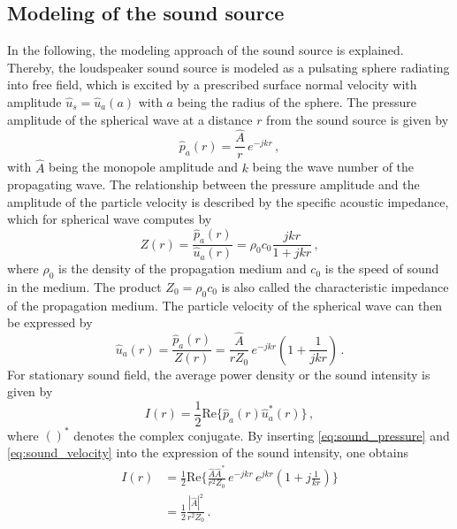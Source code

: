 \subsection*{Modeling of the sound source}

In the following, the modeling approach of the sound source is explained. Thereby, the loudspeaker sound source is modeled as a pulsating sphere radiating into free field, which is excited by a prescribed surface normal velocity with amplitude $\hat{u}_s = \hat{u}_a(a)$ with $a$ being the radius of the sphere. The pressure amplitude of the spherical wave at a distance $r$ from the sound source is given by
\begin{equation}
	\hat{p}_a(r) = \frac{\hat{A}}{r}\,e^{-jkr}\,, \label{eq:sound_pressure}
\end{equation}
with $\hat{A}$ being the monopole amplitude and $k$ being the wave number of the propagating wave. The relationship between the pressure amplitude and the amplitude of the particle velocity is described by the specific acoustic impedance, which for spherical wave computes by
\begin{equation}
	Z(r) = \frac{\hat{p}_a(r)}{\hat{u}_a(r)} = \rho_0 c_0\frac{jkr}{1+jkr}\,, \label{eq:specific_impedance}
\end{equation}
where $\rho_0$ is the density of the propagation medium and $c_0$ is the speed of sound in the medium. The product $Z_0 = \rho_0 c_0$ is also called the characteristic impedance of the propagation medium. The particle velocity of the spherical wave can then be expressed by
\begin{equation}
	\hat{u}_a(r) = \frac{\hat{p}_a(r)}{Z(r)} = \frac{\hat{A}}{r Z_0}\,e^{-jkr}\left(1+\frac{1}{jkr}\right)\,. \label{eq:sound_velocity}
\end{equation}
For stationary sound field, the average power density or the sound intensity is given by
\begin{equation}
	I(r) = \frac{1}{2}\text{Re}\lbrace\hat{p}_a(r)\hat{u}_a^*(r)\rbrace\,, \label{eq:sound_intensity}
\end{equation}
where $()^*$ denotes the complex conjugate. By inserting \cref{eq:sound_pressure} and \cref{eq:sound_velocity} into the expression of the sound intensity, one obtains
\begin{align}
	I(r) &= \frac{1}{2}\text{Re}\lbrace \frac{\hat{A}\hat{A}^*}{r^2 Z_0}\,e^{-jkr}\,e^{jkr}\left(1+j\frac{1}{kr}\right)\rbrace \\
		 &=\frac{1}{2}\frac{|\hat{A}|^2}{r^2Z_0}\,.
\end{align}
